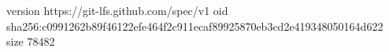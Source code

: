 version https://git-lfs.github.com/spec/v1
oid sha256:c0991262b89f46122efe464f2c911ecaf89925870eb3cd2e419348050164d622
size 78482
